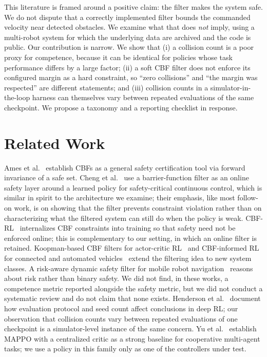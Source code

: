\documentclass[12pt]{article}
\begin{document}
This literature is framed around a positive claim: the filter makes the
system safe. We do not dispute that a correctly implemented filter bounds
the commanded velocity near detected obstacles. We examine what that does
\emph{not} imply, using a multi-robot system for which the underlying data
are archived and the code is public. Our contribution is narrow. We show
that (i) a collision count is a poor proxy for competence, because it can
be identical for policies whose task performance differs by a large factor;
(ii) a soft CBF filter does not enforce its configured margin as a hard
constraint, so ``zero collisions'' and ``the margin was respected'' are
different statements; and (iii) collision counts in a simulator-in-the-loop
harness can themselves vary between repeated evaluations of the same
checkpoint. We propose a taxonomy and a reporting checklist in response.

\section{Related Work}
Ames et al.~\cite{ames2019cbf} establish CBFs as a general safety
certification tool via forward invariance of a safe set. Cheng et
al.~\cite{cheng2019end} use a barrier-function filter as an online safety
layer around a learned policy for safety-critical continuous control, which
is similar in spirit to the architecture we examine; their emphasis, like
most follow-on work, is on showing that the filter prevents constraint
violation rather than on characterizing what the filtered system can still
do when the policy is weak. CBF-RL~\cite{cbfrl2025} internalizes CBF
constraints into training so that safety need not be enforced online; this
is complementary to our setting, in which an online filter is retained.
Koopman-based CBF filters for actor-critic RL~\cite{koopmancbf2026} and
CBF-informed RL for connected and automated vehicles~\cite{beyondsafety2026}
extend the filtering idea to new system classes. A risk-aware dynamic safety
filter for mobile robot navigation~\cite{riskaware2026} reasons about risk
rather than binary safety. We did not find, in these works, a competence
metric reported alongside the safety metric, but we did not conduct a
systematic review and do not claim that none exists. Henderson et
al.~\cite{henderson2018deep} document how evaluation protocol and seed count
affect conclusions in deep RL; our observation that collision counts vary
between repeated evaluations of one checkpoint is a simulator-level
instance of the same concern. Yu et al.~\cite{yu2022mappo} establish MAPPO
with a centralized critic as a strong baseline for cooperative multi-agent
tasks; we use a policy in this family only as one of the controllers under
test.
\end{document}
